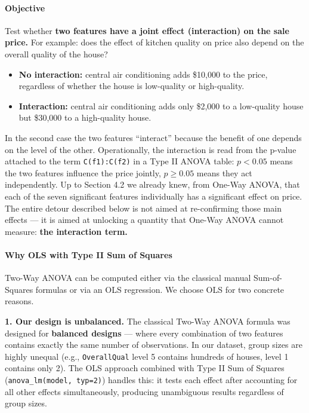 \paragraph{Objective}\label{objective}

Test whether \textbf{two features have a joint effect (interaction) on
the sale price.} For example: does the effect of kitchen quality on
price also depend on the overall quality of the house?

\begin{itemize}
\tightlist
\item
  \textbf{No interaction:} central air conditioning adds \$10,000 to the
  price, regardless of whether the house is low-quality or high-quality.
\item
  \textbf{Interaction:} central air conditioning adds only \$2,000 to a
  low-quality house but \$30,000 to a high-quality house.
\end{itemize}

In the second case the two features ``interact'' because the benefit of
one depends on the level of the other. Operationally, the interaction is
read from the p-value attached to the term \texttt{C(f1):C(f2)} in a
Type II ANOVA table: \(p < 0.05\) means the two features influence the
price jointly, \(p \geq 0.05\) means they act independently. Up to
Section 4.2 we already knew, from One-Way ANOVA, that each of the seven
significant features individually has a significant effect on price. The
entire detour described below is not aimed at re-confirming those main
effects --- it is aimed at unlocking a quantity that One-Way ANOVA
cannot measure: \textbf{the interaction term.}

\paragraph{Why OLS with Type II Sum of
Squares}\label{why-ols-with-type-ii-sum-of-squares}

Two-Way ANOVA can be computed either via the classical manual
Sum-of-Squares formulas or via an OLS regression. We choose OLS for two
concrete reasons.

\textbf{1. Our design is unbalanced.} The classical Two-Way ANOVA
formula was designed for \textbf{balanced designs} --- where every
combination of two features contains exactly the same number of
observations. In our dataset, group sizes are highly unequal (e.g.,
\texttt{OverallQual} level 5 contains hundreds of houses, level 1
contains only 2). The OLS approach combined with Type II Sum of Squares
(\texttt{anova\_lm(model,\ typ=2)}) handles this: it tests each effect
after accounting for all other effects simultaneously, producing
unambiguous results regardless of group sizes.

